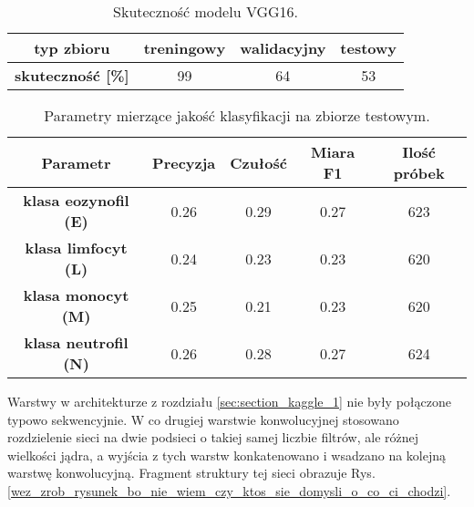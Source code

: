 {%
 \begin{table}[h!]
\centering
\caption[Short Heading]{Skuteczność modelu VGG16.}
\label{tab:VGG_1_acc}
\begin{tabular}{|c|c|c|c|}
\hline
\textbf{typ zbioru}           & \textbf{treningowy} & \textbf{walidacyjny} & \textbf{testowy} \\ \hline
\textbf{skuteczność {[}\%{]}} & 99                  & 64                   & 53               \\ \hline
\end{tabular}
\end{table}

\begin{table}[h!]
\centering
\caption[Short Heading]{Parametry mierzące jakość klasyfikacji na zbiorze testowym.}
\label{tab:VGG_1_params_val}
\begin{tabular}{|c|c|c|c|c|}
\hline
\textbf{Parametr}                               & \textbf{Precyzja} & \textbf{Czułość} & \textbf{Miara F1} & \textbf{Ilość próbek} \\ \hline
\textbf{klasa eozynofil (E)} & 0.26   & 0.29   & 0.27 & 623  \\ \hline
\textbf{klasa limfocyt (L)} & 0.24  & 0.23 & 0.23  & 620  \\ \hline
\textbf{klasa monocyt (M)} & 0.25   & 0.21    & 0.23  & 620  \\ \hline
\textbf{klasa neutrofil (N)} & 0.26   & 0.28    & 0.27  & 624  \\ \hline
\end{tabular}
\end{table}

Warstwy w architekturze z rozdziału \ref{sec:section_kaggle_1} nie były połączone typowo sekwencyjnie. W co drugiej warstwie konwolucyjnej stosowano rozdzielenie sieci na dwie podsieci o takiej samej liczbie filtrów, ale różnej wielkości jądra, a wyjścia z tych warstw konkatenowano i wsadzano na kolejną warstwę konwolucyjną. Fragment struktury tej sieci obrazuje Rys. \ref{wez_zrob_rysunek_bo_nie_wiem_czy_ktos_sie_domysli_o_co_ci_chodzi}. 



}
